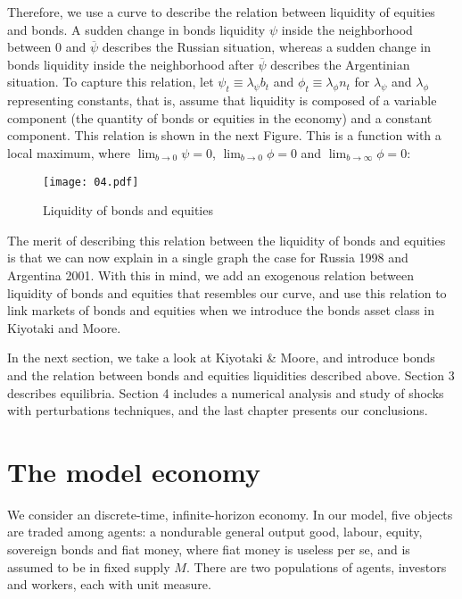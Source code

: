 \documentclass[12pt]{article}%
\begin{document}
Therefore, we use a curve to describe the relation between liquidity of equities and
bonds. A sudden change in bonds liquidity $\psi$ inside the neighborhood between 
0 and $\overline{\psi}$ describes the Russian situation, whereas a sudden change in bonds liquidity
inside the neighborhood after $\overline{\psi}$ describes the Argentinian
situation. To capture this relation, let $\psi_t \equiv \lambda_{ \psi} b_t$
and  $\phi_t \equiv \lambda_{ \phi} n_t$ for $\lambda_{ \psi}$ and $\lambda_{ \phi}$ representing
constants, that is, assume that liquidity is
composed of a variable component (the quantity of bonds or equities in the economy)
and a constant component. This relation is shown in the next Figure. This is 
a function with a local maximum, where $\lim_{b \to 0} \psi = 0$, $\lim_{b \to 0} \phi =
0$ and $\lim_{b \to \infty} \phi = 0$:

\begin{figure}[h]
\caption{Liquidity of bonds and equities}
\centering
\texttt{[image: 04.pdf]} \\
\footnotesize
\label{longgdp}
\end{figure}

The merit of describing this relation between
the liquidity of bonds and equities is that we can now explain in a single graph
the case for Russia 1998 and Argentina 2001. With this in mind, we add an
exogenous relation between liquidity of bonds and equities that resembles our
curve, and use this relation to link markets of bonds and equities when we
introduce the bonds asset class in Kiyotaki and Moore.

In the next section, we take a look at Kiyotaki \& Moore, and introduce bonds 
and the relation between bonds and equities
liquidities described above. Section 3 describes equilibria. Section 4
includes a numerical analysis and study of shocks with perturbations techniques,
 and the last chapter presents our conclusions.

\newpage
\section{The model economy}
We consider an discrete-time, infinite-horizon economy. In our model, five objects are traded among agents: a
nondurable general output good, labour, equity, sovereign bonds and fiat money, where fiat money
is useless per se, and is assumed to be in fixed supply $M$. There are two populations of
agents, investors and workers, each with unit measure.
\end{document}
